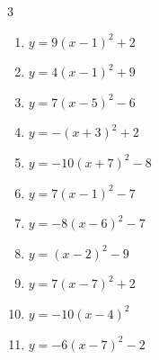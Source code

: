\begin{multicols}{3}
\begin{enumerate}
        \phantom{$\displaystyle 頂点\left( 2 , 9 \right)$}

  \item $\displaystyle y=9\left( x-1\right)^{2}+2$

        \phantom{$\displaystyle 頂点\left( 1 , 2 \right)$}

  \item $\displaystyle y=4\left( x-1\right)^{2}+9$

        \phantom{$\displaystyle 頂点\left( 1 , 9 \right)$}

  \item $\displaystyle y=7\left( x-5\right)^{2}-6$

        \phantom{$\displaystyle 頂点\left( 5 , -6 \right)$}

  \item $\displaystyle y=-\left( x+3\right)^{2}+2$

        \phantom{$\displaystyle 頂点\left( -3 , 2 \right)$}

  \item $\displaystyle y=-10\left( x+7\right)^{2}-8$

        \phantom{$\displaystyle 頂点\left( -7 , -8 \right)$}

  \item $\displaystyle y=7\left( x-1\right)^{2}-7$

        \phantom{$\displaystyle 頂点\left( 1 , -7 \right)$}

  \item $\displaystyle y=-8\left( x-6\right)^{2}-7$

        \phantom{$\displaystyle 頂点\left( 6 , -7 \right)$}

  \item $\displaystyle y=\left( x-2\right)^{2}-9$

        \phantom{$\displaystyle 頂点\left( 2 , -9 \right)$}

\columnbreak %

  \item $\displaystyle y=7\left( x-7\right)^{2}+2$

        \phantom{$\displaystyle 頂点\left( 7 , 2 \right)$}

  \item $\displaystyle y=-10\left( x-4\right)^{2}$

        \phantom{$\displaystyle 頂点\left( 4 , 0 \right)$}

  \item $\displaystyle y=-6\left( x-7\right)^{2}-2$


\end{enumerate}
\end{multicols}
